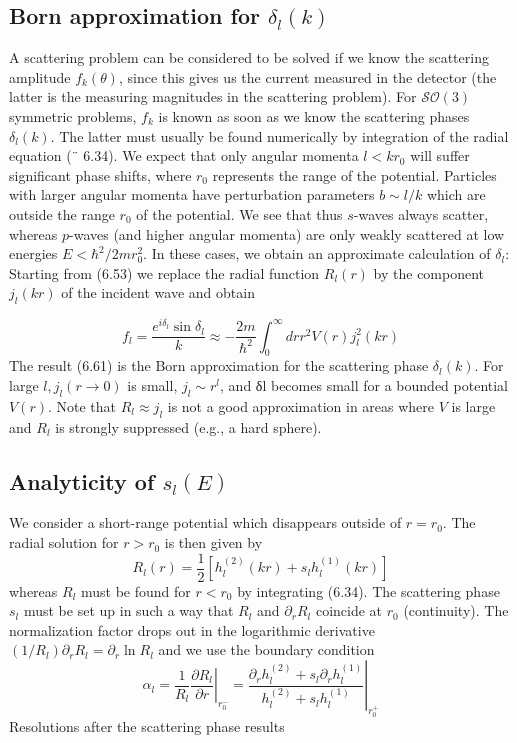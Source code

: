 \subsection{Born approximation for $\delta_l (k)$}
A scattering problem can be considered to be solved if we know the scattering amplitude $f_k (\theta)$, since this gives us the current measured in the detector (the latter is the measuring magnitudes in the scattering problem). For $\mathcal{SO} (3)$ symmetric problems, $f_k$ is known as soon as we know the scattering phases $\delta_l (k)$. The latter must usually be found numerically by integration of the radial equation (¨ 6.34). We expect that only angular momenta $l<kr_0$ will suffer significant phase shifts, where $r_0$ represents the range of the potential. Particles with larger angular momenta have perturbation parameters $b \sim l / k$ which are outside the range $r_0$ of the potential. We see that thus $s$-waves always scatter, whereas $p$-waves (and higher angular momenta) are only weakly scattered at low energies $E <\hbar^2 / 2mr^2_0$. In these cases, we obtain an approximate calculation of $\delta_l$: Starting from (6.53) we replace the radial function $R_l (r)$ by the component $j_l (kr)$ of the incident wave and obtain


\begin{equation}
    f_{l}=\frac{e^{i \delta_{l}} \sin \delta_{l}}{k} \approx-\frac{2 m}{\hbar^{2}} \int_{0}^{\infty} d r r^{2} V(r) j_{l}^{2}(k r)
    \end{equation}
The result (6.61) is the Born approximation for the scattering phase $\delta_l (k)$. For large $l, j_l (r \rightarrow 0)$ is small, $j_l \sim r^l$, and δl becomes small for a bounded potential $V (r)$. Note that $R_l \approx j_l$ is not a good approximation in areas where $V$ is large and $R_l$ is strongly suppressed (e.g., a hard sphere).
\subsection{Analyticity of $s_l (E)$}
We consider a short-range potential which disappears outside of $r = r_0$. The radial solution for $r> r_0$ is then given by
\begin{equation}
    R_{l}(r)=\frac{1}{2}\left[h_{l}^{(2)}(k r)+s_{l} h_{l}^{(1)}(k r)\right]
    \end{equation}
whereas $R_l$ must be found for $r<r_0$ by integrating (6.34). The scattering phase $s_l$ must be set up in such a way that $R_l$ and $\partial_r R_l$ coincide at $r_0$ (continuity). The normalization factor drops out in the logarithmic derivative $(1 / R_l) \partial_rR_l = \partial_r \operatorname{ln} R_l$ and we use the boundary condition
\begin{equation}
    \alpha_{l}=\left.\frac{1}{R_{l}} \frac{\partial R_{l}}{\partial r}\right|_{r_{0}^{-}}=\left.\frac{\partial_{r} h_{l}^{(2)}+s_{l} \partial_{r} h_{l}^{(1)}}{h_{l}^{(2)}+s_{l} h_{l}^{(1)}}\right|_{r_{0}^{+}}
    \end{equation}
Resolutions after the scattering phase results


